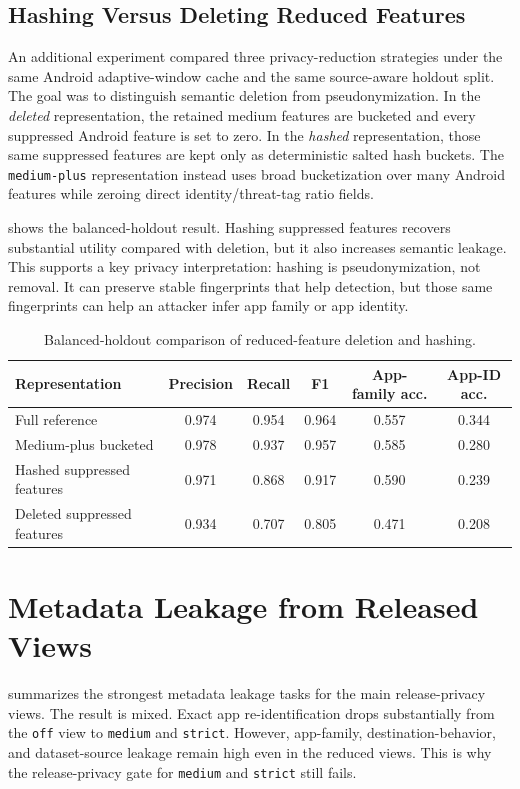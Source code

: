 \subsection{Hashing Versus Deleting Reduced Features}
An additional experiment compared three privacy-reduction strategies under the same Android
adaptive-window cache and the same source-aware holdout split. The goal was to distinguish semantic
deletion from pseudonymization. In the \emph{deleted} representation, the retained medium features
are bucketed and every suppressed Android feature is set to zero. In the \emph{hashed}
representation, those same suppressed features are kept only as deterministic salted hash buckets.
The \texttt{medium-plus} representation instead uses broad bucketization over many Android
features while zeroing direct identity/threat-tag ratio fields.

 shows the balanced-holdout result. Hashing suppressed features recovers
substantial utility compared with deletion, but it also increases semantic leakage. This supports a
key privacy interpretation: hashing is pseudonymization, not removal. It can preserve stable
fingerprints that help detection, but those same fingerprints can help an attacker infer app family
or app identity.

\begin{table}[htbp]
  \centering
  \caption{Balanced-holdout comparison of reduced-feature deletion and hashing.}
  \label{tab:hash-delete}
  \small
  \begin{tabular}{lccccc}
    \toprule
    Representation & Precision & Recall & F1 & App-family acc. & App-ID acc. \\
    \midrule
    Full reference & 0.974 & 0.954 & 0.964 & 0.557 & 0.344 \\
    Medium-plus bucketed & 0.978 & 0.937 & 0.957 & 0.585 & 0.280 \\
    Hashed suppressed features & 0.971 & 0.868 & 0.917 & 0.590 & 0.239 \\
    Deleted suppressed features & 0.934 & 0.707 & 0.805 & 0.471 & 0.208 \\
    \bottomrule
  \end{tabular}
\end{table}

\section{Metadata Leakage from Released Views}
 summarizes the strongest metadata leakage tasks for the main release-privacy
views. The result is mixed. Exact app re-identification drops substantially from the \texttt{off} view to
\texttt{medium} and \texttt{strict}. However, app-family, destination-behavior, and dataset-source
leakage remain high even in the reduced views. This is why the release-privacy gate for
\texttt{medium} and \texttt{strict} still fails.

